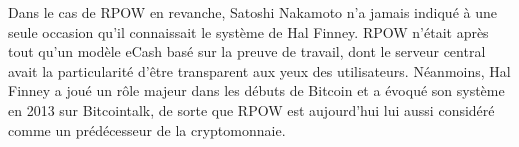 Dans le cas de RPOW en revanche, Satoshi Nakamoto n'a jamais indiqué à une seule occasion qu'il connaissait le système de Hal Finney. RPOW n'était après tout qu'un modèle eCash basé sur la preuve de travail, dont le serveur central avait la particularité d'être transparent aux yeux des utilisateurs. Néanmoins, Hal Finney a joué un rôle majeur dans les débuts de Bitcoin et a évoqué son système en 2013 sur Bitcointalk, de sorte que RPOW est aujourd'hui lui aussi considéré comme un prédécesseur de la cryptomonnaie. %

